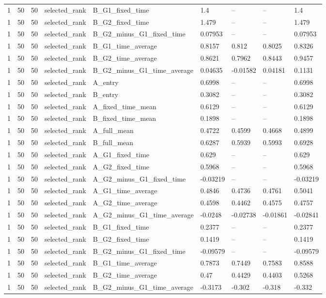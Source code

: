 \begin{longtable}{lllllllll}
1 & 50 & 50 & selected\_rank & B\_G1\_fixed\_time & 1.4 & -- & -- & 1.4 \\
1 & 50 & 50 & selected\_rank & B\_G2\_fixed\_time & 1.479 & -- & -- & 1.479 \\
1 & 50 & 50 & selected\_rank & B\_G2\_minus\_G1\_fixed\_time & 0.07953 & -- & -- & 0.07953 \\
1 & 50 & 50 & selected\_rank & B\_G1\_time\_average & 0.8157 & 0.812 & 0.8025 & 0.8326 \\
1 & 50 & 50 & selected\_rank & B\_G2\_time\_average & 0.8621 & 0.7962 & 0.8443 & 0.9457 \\
1 & 50 & 50 & selected\_rank & B\_G2\_minus\_G1\_time\_average & 0.04635 & -0.01582 & 0.04181 & 0.1131 \\
1 & 50 & 50 & selected\_rank & A\_entry & 0.6998 & -- & -- & 0.6998 \\
1 & 50 & 50 & selected\_rank & B\_entry & 0.3082 & -- & -- & 0.3082 \\
1 & 50 & 50 & selected\_rank & A\_fixed\_time\_mean & 0.6129 & -- & -- & 0.6129 \\
1 & 50 & 50 & selected\_rank & B\_fixed\_time\_mean & 0.1898 & -- & -- & 0.1898 \\
1 & 50 & 50 & selected\_rank & A\_full\_mean & 0.4722 & 0.4599 & 0.4668 & 0.4899 \\
1 & 50 & 50 & selected\_rank & B\_full\_mean & 0.6287 & 0.5939 & 0.5993 & 0.6928 \\
1 & 50 & 50 & selected\_rank & A\_G1\_fixed\_time & 0.629 & -- & -- & 0.629 \\
1 & 50 & 50 & selected\_rank & A\_G2\_fixed\_time & 0.5968 & -- & -- & 0.5968 \\
1 & 50 & 50 & selected\_rank & A\_G2\_minus\_G1\_fixed\_time & -0.03219 & -- & -- & -0.03219 \\
1 & 50 & 50 & selected\_rank & A\_G1\_time\_average & 0.4846 & 0.4736 & 0.4761 & 0.5041 \\
1 & 50 & 50 & selected\_rank & A\_G2\_time\_average & 0.4598 & 0.4462 & 0.4575 & 0.4757 \\
1 & 50 & 50 & selected\_rank & A\_G2\_minus\_G1\_time\_average & -0.0248 & -0.02738 & -0.01861 & -0.02841 \\
1 & 50 & 50 & selected\_rank & B\_G1\_fixed\_time & 0.2377 & -- & -- & 0.2377 \\
1 & 50 & 50 & selected\_rank & B\_G2\_fixed\_time & 0.1419 & -- & -- & 0.1419 \\
1 & 50 & 50 & selected\_rank & B\_G2\_minus\_G1\_fixed\_time & -0.09579 & -- & -- & -0.09579 \\
1 & 50 & 50 & selected\_rank & B\_G1\_time\_average & 0.7873 & 0.7449 & 0.7583 & 0.8588 \\
1 & 50 & 50 & selected\_rank & B\_G2\_time\_average & 0.47 & 0.4429 & 0.4403 & 0.5268 \\
1 & 50 & 50 & selected\_rank & B\_G2\_minus\_G1\_time\_average & -0.3173 & -0.302 & -0.318 & -0.332 \\
\bottomrule
\end{longtable}
\endgroup
